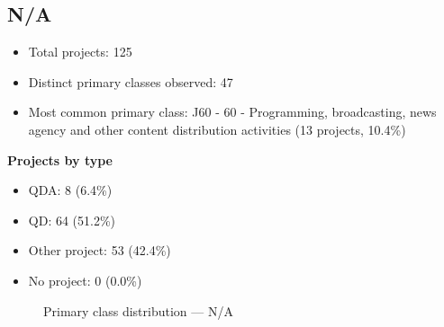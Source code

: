 \subsection{N/A}

\begin{itemize}
    \item Total projects: 125
    \item Distinct primary classes observed: 47
    \item Most common primary class: J60 - 60 - Programming, broadcasting, news agency and other content distribution activities (13 projects, 10.4\%)
\end{itemize}
\textbf{Projects by type}
\begin{itemize}
    \item QDA: 8 (6.4\%)
    \item QD: 64 (51.2\%)
    \item Other project: 53 (42.4\%)
    \item No project: 0 (0.0\%)
\end{itemize}

\begin{figure}[H]
    \centering
    
    \caption{Primary class distribution --- N/A}
\end{figure}


